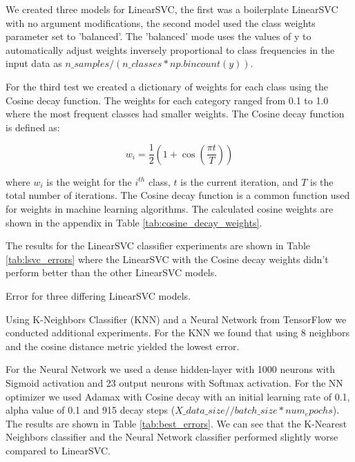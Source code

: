 We created three models for LinearSVC, the first was a boilerplate LinearSVC with no argument modifications, the second model used the class weights parameter set to 'balanced'. The 'balanced' mode uses the values of y to automatically adjust weights inversely proportional to class frequencies in the input data as $n\_samples / (n\_classes * np.bincount(y))$. 

For the third test we created a dictionary of weights for each class using the Cosine decay function. The weights for each category ranged from 0.1 to 1.0 where the most frequent classes had smaller weights. The Cosine decay function is defined as:

\begin{equation}
    w_i = \frac{1}{2} \left(1 + \cos \left(\frac{\pi t}{T}\right)\right)
\label{eq:cosine_decay}
\end{equation}

where $w_i$ is the weight for the $i^{th}$ class, $t$ is the current iteration, and $T$ is the total number of iterations. The Cosine decay function is a common function used for weights in machine learning algorithms. The calculated cosine weights are shown in the appendix in Table \ref{tab:cosine_decay_weights}.

The results for the LinearSVC classifier experiments are shown in Table \ref{tab:lsvc_errors} where the LinearSVC with the Cosine decay weights didn't perform better than the other LinearSVC models.

\begin{table}[!ht]
\centering
\caption{Error for three differing LinearSVC models.}

\label{tab:lsvc_errors}
\end{table}

Using K-Neighbors Classifier (KNN) and a Neural Network from TensorFlow we conducted additional experiments. For the KNN we found that using 8 neighbors and the cosine distance metric yielded the lowest error. 

For the Neural Network we used a dense hidden-layer with 1000 neurons with Sigmoid activation and 23 output neurons with Softmax activation. For the NN optimizer we used Adamax with Cosine decay with an initial learning rate of 0.1, alpha value of 0.1 and 915 decay steps ($X\_data\_size // batch\_size * num_epochs$). The results are shown in Table \ref{tab:best_errors}. We can see that the K-Nearest Neighbors classifier and the Neural Network classifier performed slightly worse compared to LinearSVC.


